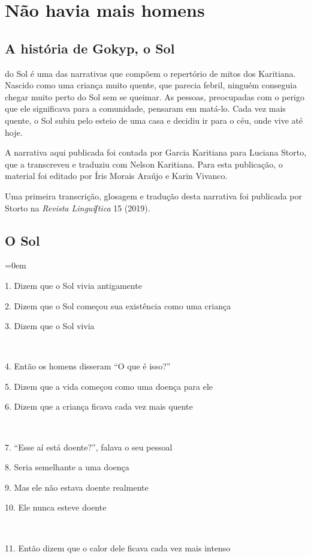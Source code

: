\part{Não havia mais homens}

\chapter{A história de Gokyp, o Sol}

 do Sol é uma das narrativas que compõem o repertório de mitos
dos Karitiana. Nascido como uma criança muito quente, que parecia
febril, ninguém conseguia chegar muito perto do Sol sem se queimar. As
pessoas, preocupadas com o perigo que ele significava para a comunidade,
pensaram em matá-lo. Cada vez mais quente, o Sol subiu pelo esteio de
uma casa e decidiu ir para o céu, onde vive até hoje.

A narrativa aqui publicada foi contada por Garcia Karitiana para Luciana
Storto, que a transcreveu e traduziu com Nelson Karitiana. Para esta
publicação, o material foi editado por Íris Morais Araújo e Karin
Vivanco.

Uma primeira transcrição, glosagem e tradução desta narrativa foi
publicada por Storto na \emph{Revista Linguíʃtica} 15 (2019).

\chapter*{O Sol}
\begingroup\parindent=0em

1. Dizem que o Sol vivia antigamente

2. Dizem que o Sol começou sua existência como uma criança

3. Dizem que o Sol vivia

~

4. Então os homens disseram ``O que é isso?''

5. Dizem que a vida começou como uma doença para ele

6. Dizem que a criança ficava cada vez mais quente

~

7. ``Esse aí está doente?'', falava o seu pessoal

8. Seria semelhante a uma doença

9. Mas ele não estava doente realmente

10. Ele nunca esteve doente

~

11. Então dizem que o calor dele ficava cada vez mais intenso

